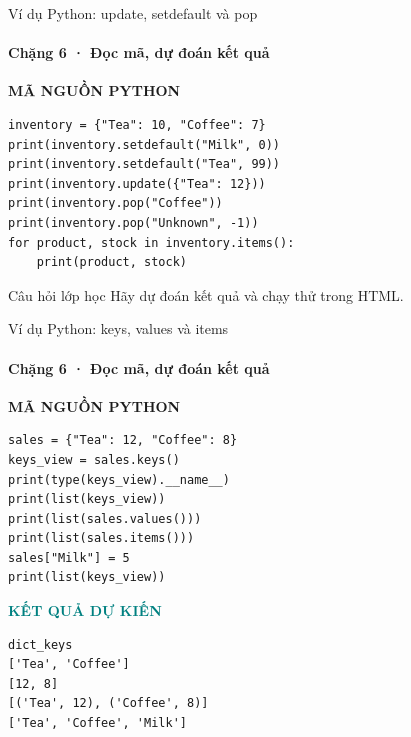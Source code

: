 \documentclass[aspectratio=169,10pt]{beamer}
\begin{document}
\begin{frame}[fragile,t]{Ví dụ Python: update, setdefault và pop}
\framesubtitle{Chặng 6 · Đọc mã, dự đoán kết quả}
\vspace{-1mm}
{\small\color{muted}\textbf{MÃ NGUỒN PYTHON}}\par\vspace{1mm}
\begin{Verbatim}[fontsize=\scriptsize,frame=single,framesep=4mm,rulecolor=\color{teal!35},breaklines=true]
inventory = {"Tea": 10, "Coffee": 7}
print(inventory.setdefault("Milk", 0))
print(inventory.setdefault("Tea", 99))
print(inventory.update({"Tea": 12}))
print(inventory.pop("Coffee"))
print(inventory.pop("Unknown", -1))
for product, stock in inventory.items():
    print(product, stock)
\end{Verbatim}
\begin{block}{Câu hỏi lớp học} Hãy dự đoán kết quả và chạy thử trong HTML. \end{block}

\end{frame}

\begin{frame}[fragile,t]{Ví dụ Python: keys, values và items}
\framesubtitle{Chặng 6 · Đọc mã, dự đoán kết quả}
\vspace{-1mm}
{\small\color{muted}\textbf{MÃ NGUỒN PYTHON}}\par\vspace{1mm}
\begin{Verbatim}[fontsize=\scriptsize,frame=single,framesep=4mm,rulecolor=\color{teal!35},breaklines=true]
sales = {"Tea": 12, "Coffee": 8}
keys_view = sales.keys()
print(type(keys_view).__name__)
print(list(keys_view))
print(list(sales.values()))
print(list(sales.items()))
sales["Milk"] = 5
print(list(keys_view))
\end{Verbatim}
\vspace{1mm}\textcolor{teal}{\scriptsize\textbf{KẾT QUẢ DỰ KIẾN}}
\begin{Verbatim}[fontsize=\scriptsize,breaklines=true]
dict_keys
['Tea', 'Coffee']
[12, 8]
[('Tea', 12), ('Coffee', 8)]
['Tea', 'Coffee', 'Milk']
\end{Verbatim}

\end{frame}
\end{document}

